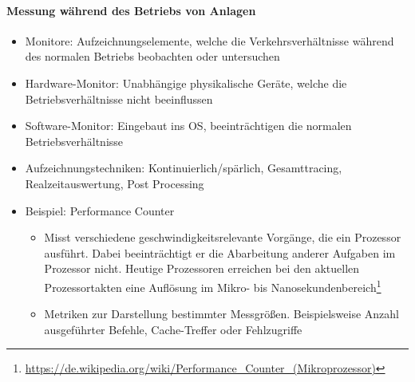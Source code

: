 	\paragraph{Messung während des Betriebs von Anlagen}
		\begin{itemize}
			\item Monitore: Aufzeichnungselemente, welche die Verkehrsverhältnisse während des normalen Betriebs beobachten oder untersuchen
			\item Hardware-Monitor: Unabhängige physikalische Geräte, welche die Betriebsverhältnisse nicht beeinflussen
			\item Software-Monitor: Eingebaut ins OS, beeinträchtigen die normalen Betriebsverhältnisse
			\item Aufzeichnungstechniken: Kontinuierlich/spärlich, Gesamttracing, Realzeitauswertung, Post Processing 
			\item Beispiel: Performance Counter
			\begin{itemize}
				\item Misst verschiedene geschwindigkeitsrelevante Vorgänge, die ein Prozessor ausführt. Dabei beeinträchtigt er die Abarbeitung anderer Aufgaben im Prozessor nicht. Heutige Prozessoren erreichen bei den aktuellen Prozessortakten eine Auflösung im Mikro- bis Nanosekundenbereich\footnote{\url{https://de.wikipedia.org/wiki/Performance_Counter_(Mikroprozessor)}}
				\item Metriken zur Darstellung bestimmter Messgrößen. Beispielsweise Anzahl ausgeführter Befehle, Cache-Treffer oder Fehlzugriffe
			\end{itemize}
		\end{itemize}

